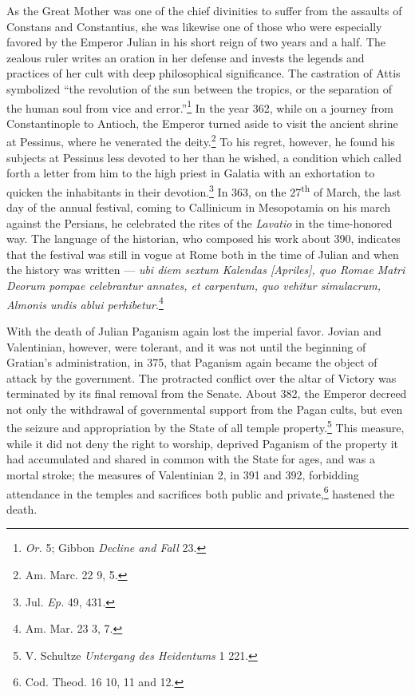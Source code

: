 \documentclass[a4paper, 11pt, oneside, polutonikogreek, french]{article}
\begin{document}
As the Great Mother was one of the chief divinities to suffer from the assaults of Constans and Constantius, she was likewise one of those who were especially favored by the Emperor Julian in his short reign of two years and a half. The zealous ruler writes an oration in her defense and invests the legends and practices of her cult with deep philosophical significance. The castration of Attis symbolized ``the revolution of the sun between the tropics, or the separation of the human soul from vice and error.''\footnote{\emph{Or.} 5; Gibbon \emph{Decline and Fall} 23.} In the year 362, while on a journey from Constantinople to Antioch, the Emperor turned aside to visit the ancient shrine at Pessinus, where he venerated the deity.\footnote{Am. Marc. 22 9, 5.} To his regret, however, he found his subjects at Pessinus less devoted to her than he wished, a condition which called forth a letter from him to the high priest in Galatia with an exhortation to quicken the inhabitants in their devotion.\footnote{Jul. \emph{Ep.} 49, 431.} In 363, on the 27\textsuperscript{th} of March, the last day of the annual festival, coming to Callinicum in Mesopotamia on his march against the Persians, he celebrated the rites of the \emph{Lavatio} in the time-honored way. The language of the historian, who composed his work about 390, indicates that the festival was still in vogue at Rome both in the time of Julian and when the history was written --- \emph{ubi diem sextum Kalendas [Apriles], quo Romae Matri Deorum pompae celebrantur annates, et carpentum, quo vehitur simulacrum, Almonis undis ablui perhibetur}.\footnote{Am. Mar. 23 3, 7.}

With the death of Julian Paganism again lost the imperial favor. Jovian and Valentinian, however, were tolerant, and it was not until the beginning of Gratian's administration, in 375, that Paganism again became the object of attack by the government. The protracted conflict over the altar of Victory was terminated by its final removal from the Senate. About 382, the Emperor decreed not only the withdrawal of governmental support from the Pagan cults, but even the seizure and appropriation by the State of all temple property.\footnote{V. Schultze \emph{Untergang des Heidentums} 1 221.} This measure, while it did not deny the right to worship, deprived Paganism of the property it had accumulated and shared in common with the State for ages, and was a mortal stroke; the measures of Valentinian 2, in 391 and 392, forbidding attendance in the temples and sacrifices both public and private,\footnote{Cod. Theod. 16 10, 11 and 12.} hastened the death.
\end{document}

